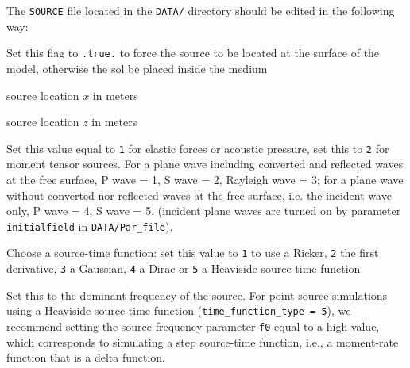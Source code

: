 \documentclass[oneside,english,onecolumn,letterpaper]{book}
\begin{document}
The \texttt{SOURCE} file located in the \texttt{DATA/} directory should be edited in the following way:
%
\begin{description}[font=\ttfamily]
\item[source\_surf] Set this flag to \texttt{.true.} to force the source to be located at the surface of the model, otherwise
the sol be placed inside the medium

\item[xs] source location $x$ in meters

\item[zs] source location $z$ in meters

\item[source\_type] Set this value equal to \texttt{1} for elastic forces or acoustic pressure,
set this to \texttt{2} for moment tensor sources.
For a plane wave including converted and reflected waves at the free surface, P wave = 1, S wave = 2, Rayleigh wave = 3;
for a plane wave without converted nor reflected waves at the free surface, i.e. the incident wave only, P wave = 4, S wave = 5.
(incident plane waves are turned on by parameter \texttt{initialfield} in \texttt{DATA/Par\_file}).

\item[time\_function\_type] Choose a source-time function: set this value to \texttt{1} to use a Ricker,
\texttt{2} the first derivative, \texttt{3} a Gaussian, \texttt{4} a Dirac or \texttt{5} a Heaviside source-time function.

\item[f0] Set this to the dominant frequency of the source.
For point-source simulations using a Heaviside source-time function (\texttt{time\_function\_type = 5}),
we recommend setting the source frequency parameter \texttt{f0}
equal to a high value, which corresponds to simulating a step source-time
function, i.e., a moment-rate function that is a delta function.


\end{description}
\end{document}
